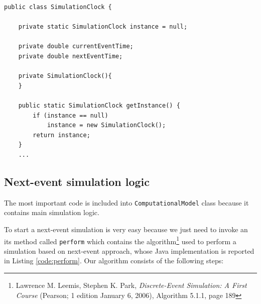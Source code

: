 \documentclass[10pt,a4paper]{article}
\begin{document}
\begin{lstlisting}[frame=lines, caption={\texttt{SimulationClock} class implementation.}, label={code:SimulationClock}]
public class SimulationClock {

    private static SimulationClock instance = null;

    private double currentEventTime;
    private double nextEventTime;

    private SimulationClock(){
    }

    public static SimulationClock getInstance() {
        if (instance == null)
            instance = new SimulationClock();
        return instance;
    } 
    ...
\end{lstlisting}


\subsection{Next-event simulation logic}

The most important code is included into \texttt{ComputationalModel} class because it contains main simulation logic.

To start a next-event simulation is very easy because we just need to invoke an its method called \texttt{perform} which contains the algorithm\footnote{Lawrence M. Leemis, Stephen K. Park, \textit{Discrete-Event Simulation: A First Course} (Pearson; 1 edition January 6, 2006), Algorithm 5.1.1, page 189} used to perform a simulation based on next-event approach, whose Java implementation is reported in Listing \ref{code:perform}. Our algorithm consists of the following steps: 
\end{document}
